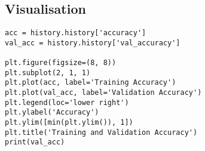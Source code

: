 \documentclass[12pt]{article}
\begin{document}
\begin{appendices}
\section{Visualisation}
\label{appendix:Visualisation}
\begin{lstlisting}
acc = history.history['accuracy']
val_acc = history.history['val_accuracy']

plt.figure(figsize=(8, 8))
plt.subplot(2, 1, 1)
plt.plot(acc, label='Training Accuracy')
plt.plot(val_acc, label='Validation Accuracy')
plt.legend(loc='lower right')
plt.ylabel('Accuracy')
plt.ylim([min(plt.ylim()), 1])
plt.title('Training and Validation Accuracy')
print(val_acc)
\end{lstlisting}

\end{appendices}
\end{document}
